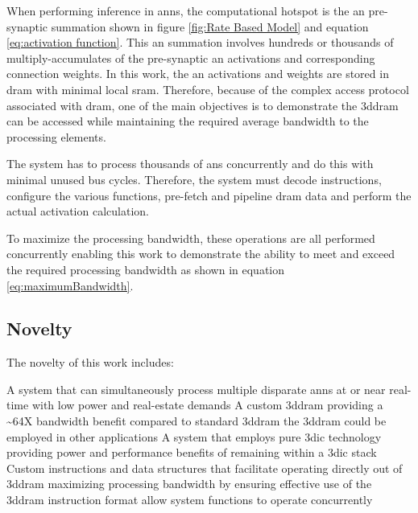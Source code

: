 When performing inference in \acp{ann}, the computational hotspot is the \ac{an} pre-synaptic summation shown in figure \ref{fig:Rate Based Model} and equation \eqref{eq:activation function}.
This \ac{an} summation involves hundreds or thousands of multiply-accumulates of the pre-synaptic \ac{an} activations and corresponding connection weights. 
In this work, the \ac{an} activations and weights are stored in \ac{dram} with minimal local \ac{sram}. 
Therefore, because of the complex access protocol associated with \ac{dram}, one of the main objectives is to demonstrate the \ac{3ddram} can be accessed while maintaining the required average bandwidth to the processing elements.
\iffalse with relatively high levels of bus efficiency. \fi

The system has to process thousands of \acp{an} concurrently and do this with minimal unused bus cycles.
Therefore, the system must decode instructions, configure the various functions, pre-fetch and pipeline \ac{dram} data and perform the actual activation calculation. 

To maximize the processing bandwidth, these operations are all performed concurrently enabling this work to demonstrate the ability to meet and exceed the required \iffalse \SI[per-mode=symbol]{32}{\tera \bit \per \second} of\fi processing bandwidth as shown in equation \eqref{eq:maximumBandwidth}.

\iffalse
The problem associated with processing \acp{ann} are outlined in section \ref{sec:The Problem}. 
\fi

\subsection[Novelty]{Novelty}
\label{sec:Novelty}

The novelty of this work includes:
\begin{outline}
    \1 A system that can simultaneously process multiple disparate \ac{ann}s at or near real-time 
      \2 with low power and real-estate demands
    \1 A custom \ac{3ddram} providing a \textasciitilde 64X bandwidth benefit compared to standard \ac{3ddram}
      \2 the \ac{3ddram} could be employed in other applications
    \1 A system that employs pure \ac{3dic} technology
      \2 providing power and performance benefits of remaining within a \ac{3dic} stack
    \1 Custom instructions and data structures that facilitate operating directly out of \ac{3ddram} 
      \2 maximizing processing bandwidth by ensuring effective use of the \ac{3ddram}
      \2 instruction format allow system functions to operate concurrently 
\end{outline}


